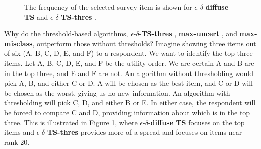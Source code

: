 \documentclass[nonblindrev]{informs3}
\newcommand{\mismin}{\textbf{max-misclass}}
\newcommand{\edts}{$\epsilon$-$\delta$-\textbf{diffuse TS} }
\newcommand{\edtsthres}{$\epsilon$-$\delta$-\textbf{TS-thres} }
\newcommand{\uncert}{\textbf{max-uncert} }
\begin{document}
\begin{figure}%
    \caption{The frequency of the selected survey item is shown for \edts and \edtsthres.}%
    \label{fig:Frequency}%
 	\begin{center}
    \qquad
	\end{center}
\end{figure}

Why do the threshold-based algorithms, \edtsthres, \uncert, and \mismin, outperform those without thresholds? Imagine showing three items out of six (A, B, C, D, E, and F) to a respondent. We want to identify the top three items. Let A, B, C, D, E, and F be the utility order. We are certain A and B are in the top three, and E and F are not. An algorithm without thresholding would pick A, B, and either C or D. A will be chosen as the best item, and C or D will be chosen as the worst, giving us no new information. An algorithm with thresholding will pick C, D, and either B or E. In either case, the respondent will be forced to compare C and D, providing information about which is in the top three. This is illustrated in Figure \ref{fig:Frequency}, where \edts focuses on the top items and \edtsthres provides more of a spread and focuses on items near rank 20.
\end{document}
